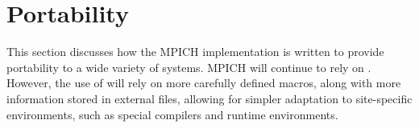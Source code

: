 \documentclass{article}
\begin{document}


\section{Portability}

This section discusses how the MPICH implementation is written to
provide portability to a wide variety of systems.  MPICH will continue
to rely on .  However, the use of 
will rely on more carefully defined macros, along with more
information stored in external files, allowing for simpler adaptation
to site-specific environments, such as special compilers and runtime
environments. 
\end{document}
